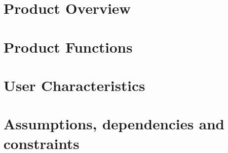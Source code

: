 \section{Product Overview}

\section{Product Functions}

\section{User Characteristics}

\section{Assumptions, dependencies and constraints}
